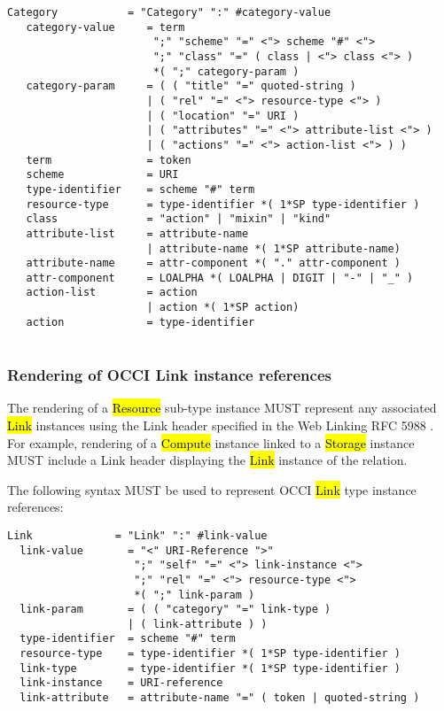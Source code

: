 \documentclass[10pt,a4paper]{article}
\begin{document}
\begin{verbatim}
Category           = "Category" ":" #category-value
   category-value     = term
                       ";" "scheme" "=" <"> scheme "#" <">
                       ";" "class" "=" ( class | <"> class <"> )
                       *( ";" category-param )
   category-param     = ( ( "title" "=" quoted-string )
                      | ( "rel" "=" <"> resource-type <"> )
                      | ( "location" "=" URI )
                      | ( "attributes" "=" <"> attribute-list <"> )
                      | ( "actions" "=" <"> action-list <"> ) )
   term               = token
   scheme             = URI
   type-identifier    = scheme "#" term
   resource-type      = type-identifier *( 1*SP type-identifier )
   class              = "action" | "mixin" | "kind"
   attribute-list     = attribute-name
                      | attribute-name *( 1*SP attribute-name)
   attribute-name     = attr-component *( "." attr-component )
   attr-component     = LOALPHA *( LOALPHA | DIGIT | "-" | "_" )
   action-list        = action 
                      | action *( 1*SP action)
   action             = type-identifier
   
\end{verbatim}

\subsubsection{Rendering of OCCI Link instance references}
The rendering of a \hl{Resource} sub-type instance \cite{occi:core}
MUST represent any associated \hl{Link} instances using the Link
header specified in the Web Linking RFC 5988 \cite{rfc5988}.  For
example, rendering of a \hl{Compute} instance linked to a \hl{Storage}
instance MUST include a Link header displaying the \hl{Link} instance
of the relation.

The following syntax MUST be used to represent OCCI \hl{Link} type
instance references:

\begin{verbatim}
Link             = "Link" ":" #link-value
  link-value       = "<" URI-Reference ">"
                    ";" "self" "=" <"> link-instance <">
                    ";" "rel" "=" <"> resource-type <">
                    *( ";" link-param )
  link-param       = ( ( "category" "=" link-type )
                   | ( link-attribute ) )
  type-identifier  = scheme "#" term
  resource-type    = type-identifier *( 1*SP type-identifier )
  link-type        = type-identifier *( 1*SP type-identifier )
  link-instance    = URI-reference
  link-attribute   = attribute-name "=" ( token | quoted-string )

\end{verbatim}
\end{document}
